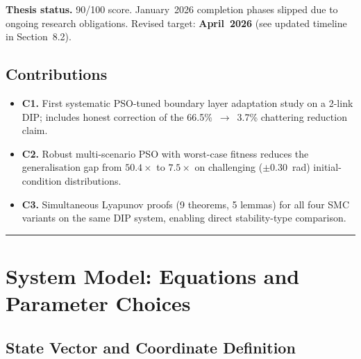 \documentclass[10pt, a4paper]{article}
\begin{document}
\textbf{Thesis status.} 90/100 score.
January~2026 completion phases slipped due to ongoing research obligations.
Revised target: \textbf{April~2026} (see updated timeline in Section~8.2).

\subsection*{Contributions}
\begin{itemize}[leftmargin=1.5em,itemsep=0.2em]
  \item \textbf{C1.} First systematic PSO-tuned boundary layer adaptation study on a
  2-link DIP; includes honest correction of the 66.5\%\ $\to$\ 3.7\% chattering
  reduction claim.
  \item \textbf{C2.} Robust multi-scenario PSO with worst-case fitness reduces the
  generalisation gap from $50.4\times$ to $7.5\times$ on challenging
  ($\pm0.30$~rad) initial-condition distributions.
  \item \textbf{C3.} Simultaneous Lyapunov proofs (9 theorems, 5 lemmas) for all four
  SMC variants on the same DIP system, enabling direct stability-type comparison.
\end{itemize}

\vspace{0.5em}
\noindent\textcolor{headblue}{\rule{\linewidth}{0.4pt}}
\vspace{0.5em}

\tableofcontents
\clearpage

\section{System Model: Equations and Parameter Choices}

\subsection{State Vector and Coordinate Definition}
\end{document}
